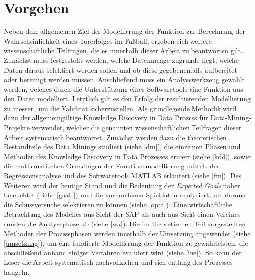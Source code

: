 \section{Vorgehen}

Neben dem allgemeinen Ziel der Modellierung der Funktion zur Berechnung der Wahrscheinlichkeit eines Torerfolges im Fußball, ergeben sich weitere wissenschaftliche Teilfragen, die es innerhalb dieser Arbeit zu beantworten gilt. Zunächst muss festgestellt werden, welche Datenmenge zugrunde liegt, welche Daten daraus selektiert werden sollen und ob diese gegebenenfalls aufbereitet oder bereinigt werden müssen. Anschließend muss ein Analysewerkzeug gewählt werden, welches durch die Unterstützung eines Softwaretools eine Funktion aus den Daten modelliert. Letztlich gilt es den Erfolg der resultierenden Modellierung zu messen, um die Validität sicherzustellen. Als grundlegende Methodik wird dazu der allgemeingültige Knowledge Discovery in Data Prozess für Data-Mining-Projekte verwendet, welcher die genannten wissenschaftlichen Teilfragen dieser Arbeit systematisch beantwortet. Zunächst werden dazu die theoretischen Bestandteile des Data Minings studiert (siehe \vref{dm}), die einzelnen Phasen und Methoden des Knowledge Discovery in Data Prozesses eruiert (siehe \vref{kdd}), sowie die mathematischen Grundlagen der Funktionsmodellierung mittels der Regressionsanalyse und des Softwaretools MATLAB erläutert (siehe \vref{fm}). Des Weiteren wird der heutige Stand und die Bedeutung der \textit{Expected Goals} näher beleuchtet (siehe \vref{goals}) und die vorhandenen Spieldaten analysiert, um daraus die Schussversuche selektieren zu können (siehe \vref{opta}). Eine wirtschaftliche Betrachtung des Modelles aus Sicht der SAP als auch aus Sicht einen Vereines runden die Analysephase ab (siehe \vref{wa}). Die im theoretischen Teil vorgestellten Methoden der Prozessphasen werden innerhalb der Umsetzung angewendet (siehe \vref{umsetzung}), um eine fundierte Modellierung der Funktion zu gewährleisten, die abschließend anhand einiger Verfahren evaluiert wird (siehe \vref{iue}). So kann der Leser die Arbeit systematisch nachvollziehen und sich entlang des Prozesses hangeln.

